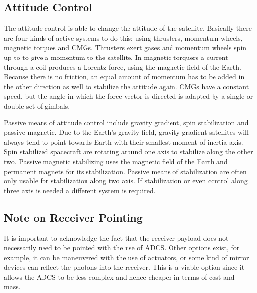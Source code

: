 \subsection{Attitude Control}
The attitude control is able to change the attitude of the satellite. Basically there are four kinds of active systems to do this: using thrusters, momentum wheels, magnetic torques and \acp{CMG}. Thrusters exert gases and momentum wheels spin up to to give a momentum to the satellite. In magnetic torquers a current through a coil produces a Lorentz force, using the magnetic field of the Earth. Because there is no friction, an equal amount of momentum has to be added in the other direction as well to stabilize the attitude again. \ac{CMG}s have a constant speed, but the angle in which the force vector is directed is adapted by a single or double set of gimbals. 

Passive means of attitude control include gravity gradient, spin stabilization and passive magnetic. Due to the Earth's gravity field, gravity gradient satellites will always tend to point towards Earth with their smallest moment of inertia axis. Spin stabilized spacecraft are rotating around one axis to stabilize along the other two. Passive magnetic stabilizing uses the magnetic field of the Earth and permanent magnets for its stabilization. Passive means of stabilization are often only usable for stabilization along two axis. If stabilization or even control along three axis is needed a different system is required.

\subsection{Note on Receiver Pointing}
It is important to acknowledge the fact that the receiver payload does not necessarily need to be pointed with the use of \ac{ADCS}. Other options exist, for example, it can be maneuvered with the use of actuators, or some kind of mirror devices can reflect the photons into the receiver. This is a viable option since it allows the \ac{ADCS} to be less complex and hence cheaper in terms of cost and mass.

